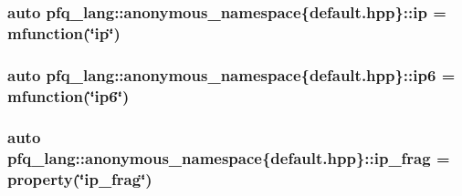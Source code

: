 \hypertarget{namespacepfq__lang_1_1anonymous__namespace_02default_8hpp_03_a27d30e7744c84a7cdc41a710ee16b885}{
\subsubsection[{ip}]{\setlength{\rightskip}{0pt plus 5cm}auto pfq\+\_\+lang\+::anonymous\+\_\+namespace\{default.\+hpp\}\+::ip = {\bf mfunction}(\char`\"{}ip\char`\"{})}}\label{namespacepfq__lang_1_1anonymous__namespace_02default_8hpp_03_a27d30e7744c84a7cdc41a710ee16b885}
\hypertarget{namespacepfq__lang_1_1anonymous__namespace_02default_8hpp_03_a566cbe8627dd2ae05071690ef64dbd12}{
\subsubsection[{ip6}]{\setlength{\rightskip}{0pt plus 5cm}auto pfq\+\_\+lang\+::anonymous\+\_\+namespace\{default.\+hpp\}\+::ip6 = {\bf mfunction}(\char`\"{}ip6\char`\"{})}}\label{namespacepfq__lang_1_1anonymous__namespace_02default_8hpp_03_a566cbe8627dd2ae05071690ef64dbd12}
\hypertarget{namespacepfq__lang_1_1anonymous__namespace_02default_8hpp_03_a29f207a5d209c3968f5d2e8f3c19c239}{
\subsubsection[{ip\+\_\+frag}]{\setlength{\rightskip}{0pt plus 5cm}auto pfq\+\_\+lang\+::anonymous\+\_\+namespace\{default.\+hpp\}\+::ip\+\_\+frag = {\bf property}(\char`\"{}ip\+\_\+frag\char`\"{})}}\label{namespacepfq__lang_1_1anonymous__namespace_02default_8hpp_03_a29f207a5d209c3968f5d2e8f3c19c239}
